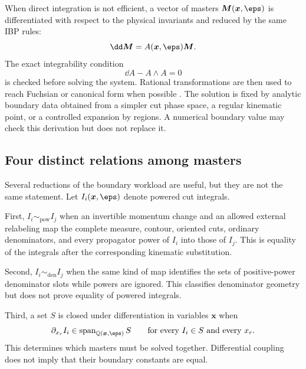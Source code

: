 When direct integration is not efficient, a vector of masters
$\boldsymbol M(\boldsymbol x,\eps)$ is differentiated with respect to the
physical invariants and reduced by the same IBP rules:
\begin{equation}
 \dd\boldsymbol M=A(\boldsymbol x,\eps)\boldsymbol M.
 \label{eq:master-differential-system}
\end{equation}
The exact integrability condition
\begin{equation}
 \dd A-A\wedge A=0
 \label{eq:flatness-condition}
\end{equation}
is checked before solving the system.  Rational transformations are then used
to reach Fuchsian or canonical form when possible
\cite{Henn:2013pwa,Meyer:2017joq}.  The solution is fixed by analytic boundary
data obtained from a simpler cut phase space, a regular kinematic point, or a
controlled expansion by regions.  A numerical boundary value may check this
derivation but does not replace it.

\subsection{Four distinct relations among masters}

Several reductions of the boundary workload are useful, but they are not the
same statement.  Let $I_i(\boldsymbol x,\eps)$ denote powered cut integrals.

First, $I_i\sim_{\mathrm{pow}}I_j$ when an invertible momentum change and an
allowed external relabeling map the complete measure, contour, oriented cuts,
ordinary denominators, and every propagator power of $I_i$ into those of
$I_j$.  This is equality of the integrals after the corresponding kinematic
substitution.

Second, $I_i\sim_{\mathrm{den}}I_j$ when the same kind of map identifies the
sets of positive-power denominator slots while powers are ignored.  This
classifies denominator geometry but does not prove equality of powered
integrals.

Third, a set $S$ is closed under differentiation in variables
$\boldsymbol x$ when
\begin{equation}
 \partial_{x_r}I_i\in
 \operatorname{span}_{\mathbb Q(\boldsymbol x,\eps)}S
 \qquad
 \text{for every }I_i\in S\text{ and every }x_r.
 \label{eq:de-closure-definition}
\end{equation}
This determines which masters must be solved together.  Differential coupling
does not imply that their boundary constants are equal.

